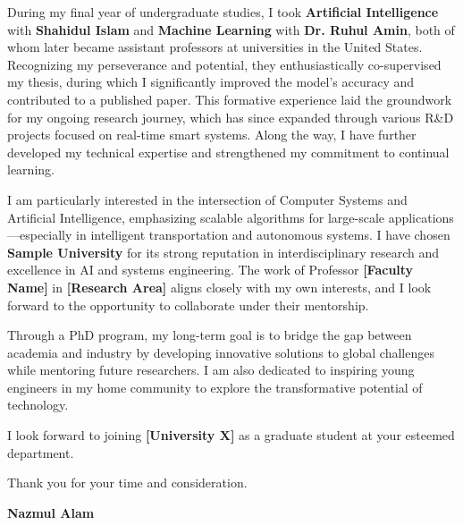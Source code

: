 \documentclass[11pt]{article}
\begin{document}
During my final year of undergraduate studies, I took \textbf{Artificial Intelligence} with \textbf{Shahidul Islam} and \textbf{Machine Learning} with \textbf{Dr. Ruhul Amin}, both of whom later became assistant professors at universities in the United States. Recognizing my perseverance and potential, they enthusiastically co-supervised my thesis, during which I significantly improved the model’s accuracy and contributed to a published paper. This formative experience laid the groundwork for my ongoing research journey, which has since expanded through various R&D projects focused on real-time smart systems. Along the way, I have further developed my technical expertise and strengthened my commitment to continual learning.

I am particularly interested in the intersection of Computer Systems and Artificial Intelligence, emphasizing scalable algorithms for large-scale applications—especially in intelligent transportation and autonomous systems. I have chosen \textbf{Sample University} for its strong reputation in interdisciplinary research and excellence in AI and systems engineering. The work of Professor \textbf{[Faculty Name]} in \textbf{[Research Area]} aligns closely with my own interests, and I look forward to the opportunity to collaborate under their mentorship.

Through a PhD program, my long-term goal is to bridge the gap between academia and industry by developing innovative solutions to global challenges while mentoring future researchers. I am also dedicated to inspiring young engineers in my home community to explore the transformative potential of technology.

I look forward to joining \textbf{[University X]} as a graduate student at your esteemed department.
\begin{flushleft}
    Thank you for your time and consideration.
\end{flushleft}

\textbf{Nazmul Alam}
\end{document}
